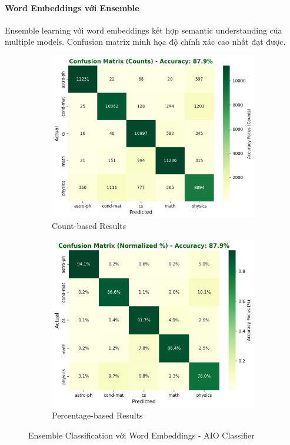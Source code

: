\paragraph{Word Embeddings với Ensemble}

Ensemble learning với word embeddings kết hợp semantic understanding của multiple models. Confusion matrix minh họa độ chính xác cao nhất đạt được.

\begin{figure}[H]
\centering
\begin{subfigure}{0.48\textwidth}
    \centering
    \includegraphics[width=\textwidth]{image/ensemble_embed_count.png}
    \caption{Count-based Results}
    \label{fig:ensemble_embed_count_improvements}
\end{subfigure}
\hfill
\begin{subfigure}{0.48\textwidth}
    \centering
    \includegraphics[width=\textwidth]{image/Ensemble_Embed_percent.png}
    \caption{Percentage-based Results}
    \label{fig:ensemble_embed_percent_improvements}
\end{subfigure}
\caption{Ensemble Classification với Word Embeddings - AIO Classifier}
\label{fig:ensemble_embed_results_improvements}
\end{figure}

